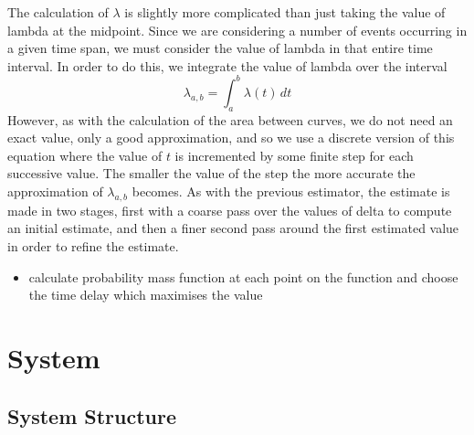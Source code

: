 \documentclass[a4paper,11pt]{article}
\begin{document}
The calculation of $\lambda$ is slightly more complicated than just taking the
value of lambda at the midpoint. Since we are considering a number of events
occurring in a given time span, we must consider the value of lambda in that
entire time interval. In order to do this, we integrate the value of lambda over
the interval
\begin{equation}
\lambda_{a,b}=\int_a^b\lambda(t)\,dt
\end{equation}
However, as with the calculation of the area between curves, we do not need an
exact value, only a good approximation, and so we use a discrete version of this
equation where the value of $t$ is incremented by some finite step for each successive
value. The smaller the value of the step the more accurate the approximation of
$\lambda_{a,b}$ becomes. As with the previous estimator, the estimate is made in
two stages, first with a coarse pass over the values of delta to compute an
initial estimate, and then a finer second pass around the first estimated value
in order to refine the estimate.
\begin{itemize}
\item calculate probability mass function at each point on the function and choose
  the time delay which maximises the value
\end{itemize}
\section{System}
\label{sec-6}
\subsection{System Structure}
\label{sec-6-1}
\end{document}

